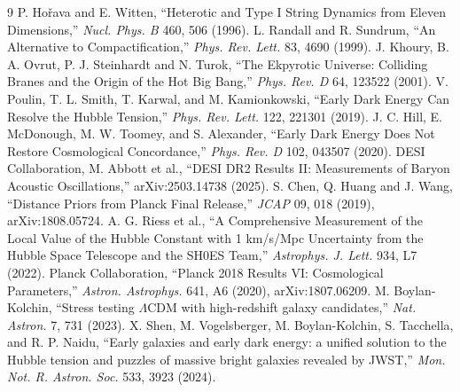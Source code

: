 \documentclass[11pt,a4paper,twocolumn]{article}
\begin{document}
\begin{thebibliography}{9}
 P. Ho\v{r}ava and E. Witten, ``Heterotic and Type I String Dynamics from Eleven Dimensions,'' \textit{Nucl. Phys. B} 460, 506 (1996).
 L. Randall and R. Sundrum, ``An Alternative to Compactification,'' \textit{Phys. Rev. Lett.} 83, 4690 (1999).
 J. Khoury, B. A. Ovrut, P. J. Steinhardt and N. Turok, ``The Ekpyrotic Universe: Colliding Branes and the Origin of the Hot Big Bang,'' \textit{Phys. Rev. D} 64, 123522 (2001).
 V. Poulin, T. L. Smith, T. Karwal, and M. Kamionkowski, ``Early Dark Energy Can Resolve the Hubble Tension,'' \textit{Phys. Rev. Lett.} 122, 221301 (2019).
 J. C. Hill, E. McDonough, M. W. Toomey, and S. Alexander, ``Early Dark Energy Does Not Restore Cosmological Concordance,'' \textit{Phys. Rev. D} 102, 043507 (2020).
 DESI Collaboration, M. Abbott et al., ``DESI DR2 Results II: Measurements of Baryon Acoustic Oscillations,'' arXiv:2503.14738 (2025).
 S. Chen, Q. Huang and J. Wang, ``Distance Priors from Planck Final Release,'' \textit{JCAP} 09, 018 (2019), arXiv:1808.05724.
 A. G. Riess et al., ``A Comprehensive Measurement of the Local Value of the Hubble Constant with 1 km/s/Mpc Uncertainty from the Hubble Space Telescope and the SH0ES Team,'' \textit{Astrophys. J. Lett.} 934, L7 (2022).
 Planck Collaboration, ``Planck 2018 Results VI: Cosmological Parameters,'' \textit{Astron. Astrophys.} 641, A6 (2020), arXiv:1807.06209.
 M. Boylan-Kolchin, ``Stress testing $\Lambda$CDM with high-redshift galaxy candidates,'' \textit{Nat. Astron.} 7, 731 (2023).
 X. Shen, M. Vogelsberger, M. Boylan-Kolchin, S. Tacchella, and R. P. Naidu, ``Early galaxies and early dark energy: a unified solution to the Hubble tension and puzzles of massive bright galaxies revealed by JWST,'' \textit{Mon. Not. R. Astron. Soc.} 533, 3923 (2024).
\end{thebibliography}
\end{document}
